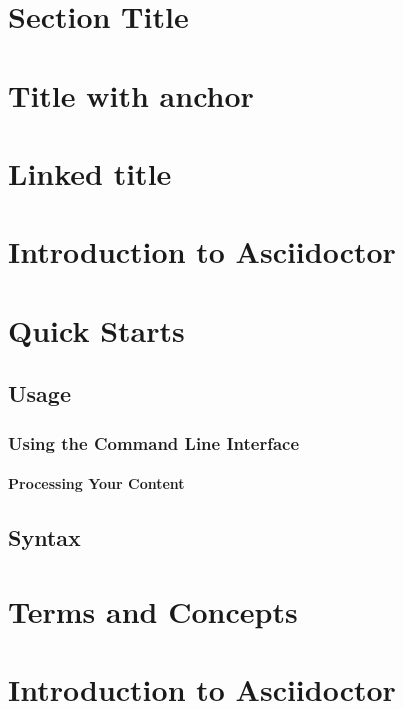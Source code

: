 \section*{\hypertarget{_section_title}{Section Title}}

\section*{\hypertarget{_title_with_anchor}{Title with anchor}}

\section*{\hypertarget{_linked_title}{Linked title}}

\section{\hypertarget{_introduction_to_asciidoctor}{Introduction to Asciidoctor}}
\section{\hypertarget{_quick_starts}{Quick Starts}}
\subsection{\hypertarget{_usage}{Usage}}
\subsubsection{\hypertarget{_using_the_command_line_interface}{Using the Command Line Interface}}
\paragraph{\hypertarget{_processing_your_content}{Processing Your Content}}
\subsection{\hypertarget{_syntax}{Syntax}}
\section{\hypertarget{_terms_and_concepts}{Terms and Concepts}}

\section{\hypertarget{_introduction_to_asciidoctor}{Introduction to Asciidoctor}}
